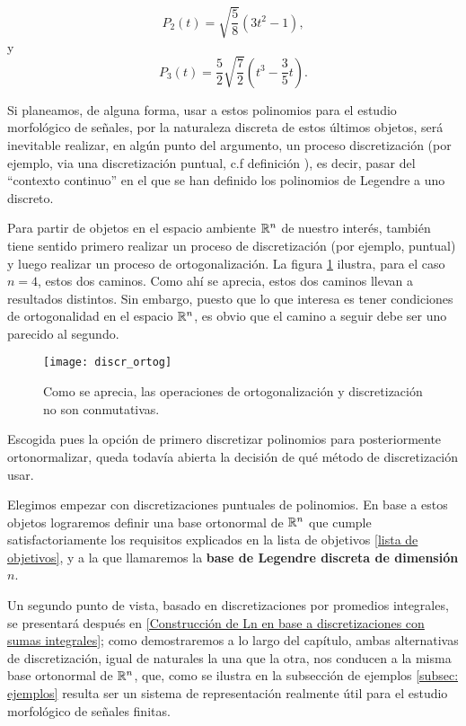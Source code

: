 \[
P_{2}(t) = \sqrt{\frac{5}{8}}\left( 3t^{2}-1 \right),
\]
y
\[
P_{3}(t) = \frac{5}{2} \sqrt{\frac{7}{2}}\left( t^{3}- \frac{3}{5}t\right).
\]

Si planeamos, de alguna forma, usar a estos polinomios
para el estudio morfológico de señales, por la naturaleza
discreta de estos últimos objetos, será
inevitable realizar, en algún punto 
del argumento, un proceso discretización
(por ejemplo, 
via una discretización
puntual, c.f definición ), es decir,
pasar del ``contexto continuo'' en el que se han
definido los polinomios de Legendre a uno discreto.


Para partir de
objetos en el espacio ambiente
$\mathbb{R}^{n}$ de nuestro interés,
también tiene sentido primero realizar
un proceso de discretización (por ejemplo, 
puntual) y luego realizar
un proceso de ortogonalización. La figura
\ref{fig: ortogonalizacion, discretizacion}
ilustra, para el caso $n=4$, estos dos caminos.
Como ahí se aprecia, estos dos caminos llevan 
a resultados distintos. Sin embargo, puesto que lo
que interesa es tener condiciones de ortogonalidad
en el espacio $\mathbb{R}^{n}$, es obvio que 
el camino a seguir debe ser uno parecido al segundo.

\newpage

\begin{figure}[H]
\centering\captionsetup{format = hang}
	\begin{measuredfigure}
		\label{fig: ortogonalizacion, discretizacion}
		\texttt{[image: discr\_ortog]} 
		\caption{Como se aprecia, las operaciones de
		ortogonalización y discretización no son conmutativas.}
 	\end{measuredfigure}
 \end{figure}

Escogida pues la opción de primero 
discretizar polinomios para posteriormente
ortonormalizar, queda todavía abierta
la decisión de qué método de discretización usar.

Elegimos empezar
con discretizaciones puntuales de polinomios.
En base a estos objetos lograremos definir
una base ortonormal de $\mathbb{R}^{n}$ que cumple satisfactoriamente
los requisitos explicados en la lista de objetivos  
\ref{lista de objetivos}, y a la que llamaremos
la \textbf{base de Legendre discreta de dimensión $n$}.

Un segundo punto de vista, basado
en discretizaciones por promedios integrales,
se presentará después en
\ref{Construcción de Ln en base a discretizaciones con sumas integrales}; 
como demostraremos a lo largo del capítulo, 
ambas alternativas
de discretización, igual de naturales la una que la otra, nos
conducen a la misma base ortonormal de $\mathbb{R}^{n}$,
que, como se ilustra en la subsección de ejemplos
\ref{subsec: ejemplos}
resulta ser un sistema de representación
realmente útil para el estudio morfológico de señales finitas.